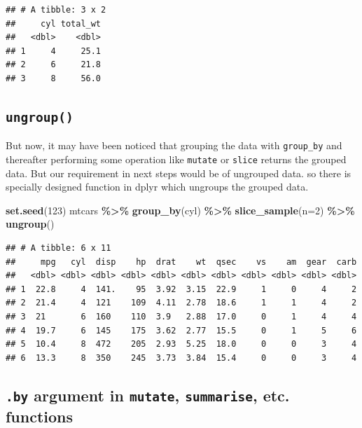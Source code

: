 \documentclass[
]{book}
\newenvironment{Shaded}{\begin{snugshade}}{\end{snugshade}}
\newcommand{\AttributeTok}[1]{\textcolor[rgb]{0.13,0.29,0.53}{#1}}
\newcommand{\DecValTok}[1]{\textcolor[rgb]{0.00,0.00,0.81}{#1}}
\newcommand{\FunctionTok}[1]{\textcolor[rgb]{0.13,0.29,0.53}{\textbf{#1}}}
\newcommand{\NormalTok}[1]{#1}
\newcommand{\SpecialCharTok}[1]{\textcolor[rgb]{0.81,0.36,0.00}{\textbf{#1}}}
\begin{document}
\begin{verbatim}
## # A tibble: 3 x 2
##     cyl total_wt
##   <dbl>    <dbl>
## 1     4     25.1
## 2     6     21.8
## 3     8     56.0
\end{verbatim}

\hypertarget{ungroup}{%
\subsection{\texorpdfstring{\texttt{ungroup()}}{ungroup()}}\label{ungroup}}

But now, it may have been noticed that grouping the data with \texttt{group\_by} and thereafter performing some operation like \texttt{mutate} or \texttt{slice} returns the grouped data. But our requirement in next steps would be of ungrouped data. so there is specially designed function in dplyr which ungroups the grouped data.

\begin{Shaded}
\begin{Highlighting}[]
\FunctionTok{set.seed}\NormalTok{(}\DecValTok{123}\NormalTok{)}
\NormalTok{mtcars }\SpecialCharTok{\%\textgreater{}\%} 
  \FunctionTok{group\_by}\NormalTok{(cyl) }\SpecialCharTok{\%\textgreater{}\%} 
  \FunctionTok{slice\_sample}\NormalTok{(}\AttributeTok{n=}\DecValTok{2}\NormalTok{) }\SpecialCharTok{\%\textgreater{}\%} 
  \FunctionTok{ungroup}\NormalTok{()}
\end{Highlighting}
\end{Shaded}

\begin{verbatim}
## # A tibble: 6 x 11
##     mpg   cyl  disp    hp  drat    wt  qsec    vs    am  gear  carb
##   <dbl> <dbl> <dbl> <dbl> <dbl> <dbl> <dbl> <dbl> <dbl> <dbl> <dbl>
## 1  22.8     4  141.    95  3.92  3.15  22.9     1     0     4     2
## 2  21.4     4  121    109  4.11  2.78  18.6     1     1     4     2
## 3  21       6  160    110  3.9   2.88  17.0     0     1     4     4
## 4  19.7     6  145    175  3.62  2.77  15.5     0     1     5     6
## 5  10.4     8  472    205  2.93  5.25  18.0     0     0     3     4
## 6  13.3     8  350    245  3.73  3.84  15.4     0     0     3     4
\end{verbatim}

\hypertarget{by-argument-in-mutate-summarise-etc.-functions}{%
\subsection{\texorpdfstring{\texttt{.by} argument in \texttt{mutate}, \texttt{summarise}, etc. functions}{.by argument in mutate, summarise, etc. functions}}\label{by-argument-in-mutate-summarise-etc.-functions}}
\end{document}
